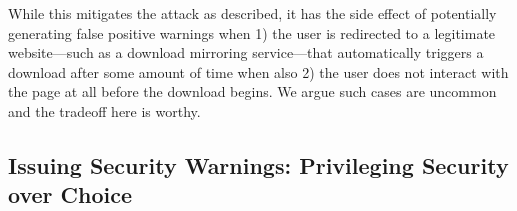 While this mitigates the attack as described, it has the side effect of
potentially generating false positive warnings when 1) the user is redirected to
a legitimate website---such as a download mirroring service---that automatically
triggers a download after some amount of time when also 2) the user does not
interact with the page at all before the download begins. We argue such cases
are uncommon and the tradeoff here is worthy.

\subsection{Issuing Security Warnings: Privileging Security over Choice}

